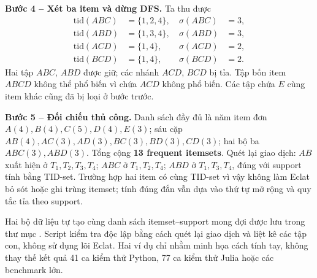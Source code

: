 \noindent\textbf{Bước 4 -- Xét ba item và dừng DFS.} Ta thu được
\begin{equation*}
\begin{aligned}
\mathrm{tid}(ABC)&=\{1,2,4\},\ &\sigma(ABC)&=3,\\
\mathrm{tid}(ABD)&=\{1,3,4\},\ &\sigma(ABD)&=3,\\
\mathrm{tid}(ACD)&=\{1,4\},\ &\sigma(ACD)&=2,\\
\mathrm{tid}(BCD)&=\{1,4\},\ &\sigma(BCD)&=2.
\end{aligned}
\end{equation*}
Hai tập $ABC$, $ABD$ được giữ; các nhánh $ACD$, $BCD$ bị tỉa. Tập bốn item $ABCD$ không thể phổ biến vì chứa $ACD$ không phổ biến. Các tập chứa $E$ cùng item khác cũng đã bị loại ở bước trước.

\noindent\textbf{Bước 5 -- Đối chiếu thủ công.} Danh sách đầy đủ là năm item đơn $A(4),B(4),C(5),D(4),E(3)$; sáu cặp $AB(4),AC(3),AD(3),BC(3),BD(3),CD(3)$; hai bộ ba $ABC(3),ABD(3)$. Tổng cộng \textbf{13 frequent itemsets}. Quét lại giao dịch: $AB$ xuất hiện ở $T_1,T_2,T_3,T_4$; $ABC$ ở $T_1,T_2,T_4$; $ABD$ ở $T_1,T_3,T_4$, đúng với support tính bằng TID-set. Trường hợp hai item có cùng TID-set vì vậy không làm Eclat bỏ sót hoặc ghi trùng itemset; tính đúng đắn vẫn dựa vào thứ tự mở rộng và quy tắc tỉa theo support.

Hai bộ dữ liệu tự tạo cùng danh sách itemset--support mong đợi được lưu trong thư mục . Script  kiểm tra độc lập bằng cách quét lại giao dịch và liệt kê các tập con, không sử dụng lõi Eclat. Hai ví dụ chỉ nhằm minh họa cách tính tay, không thay thế kết quả 41 ca kiểm thử Python, 77 ca kiểm thử Julia hoặc các benchmark lớn.

\FloatBarrier
